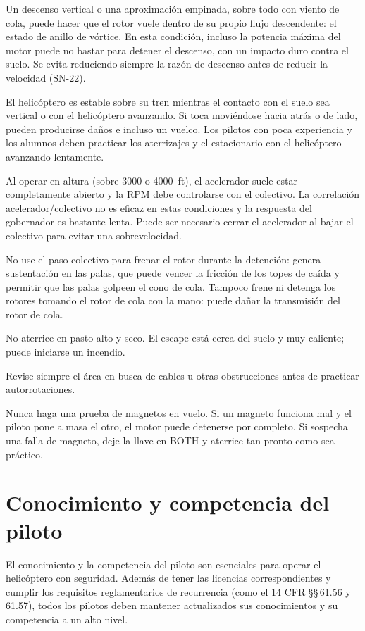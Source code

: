 \begin{pasos}
\item Un descenso vertical o una aproximación empinada, sobre todo con viento de cola, puede hacer que el rotor vuele dentro de su propio flujo descendente: el estado de anillo de vórtice. En esta condición, incluso la potencia máxima del motor puede no bastar para detener el descenso, con un impacto duro contra el suelo. Se evita reduciendo siempre la razón de descenso antes de reducir la velocidad (SN-22).
\item El helicóptero es estable sobre su tren mientras el contacto con el suelo sea vertical o con el helicóptero avanzando. Si toca moviéndose hacia atrás o de lado, pueden producirse daños e incluso un vuelco. Los pilotos con poca experiencia y los alumnos deben practicar los aterrizajes y el estacionario con el helicóptero avanzando lentamente.
\item Al operar en altura (sobre 3000 o 4000~ft), el acelerador suele estar completamente abierto y la RPM debe controlarse con el colectivo. La correlación acelerador/colectivo no es eficaz en estas condiciones y la respuesta del gobernador es bastante lenta. Puede ser necesario cerrar el acelerador al bajar el colectivo para evitar una sobrevelocidad.
\item No use el paso colectivo para frenar el rotor durante la detención: genera sustentación en las palas, que puede vencer la fricción de los topes de caída y permitir que las palas golpeen el cono de cola. Tampoco frene ni detenga los rotores tomando el rotor de cola con la mano: puede dañar la transmisión del rotor de cola.
\item No aterrice en pasto alto y seco. El escape está cerca del suelo y muy caliente; puede iniciarse un incendio.
\item Revise siempre el área en busca de cables u otras obstrucciones antes de practicar autorrotaciones.
\item Nunca haga una prueba de magnetos en vuelo. Si un magneto funciona mal y el piloto pone a masa el otro, el motor puede detenerse por completo. Si sospecha una falla de magneto, deje la llave en \textsf{BOTH} y aterrice tan pronto como sea práctico.
\end{pasos}

\section{Conocimiento y competencia del piloto}

El conocimiento y la competencia del piloto son esenciales para operar el helicóptero con seguridad. Además de tener las licencias correspondientes y cumplir los requisitos reglamentarios de recurrencia (como el 14 CFR \S\S\,61.56 y 61.57), todos los pilotos deben mantener actualizados sus conocimientos y su competencia a un alto nivel.

